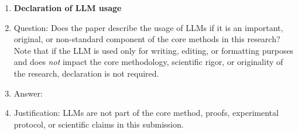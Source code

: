 \begin{enumerate}
\item {\bf Declaration of LLM usage}
    \item[] Question: Does the paper describe the usage of LLMs if it is an important, original, or non-standard component of the core methods in this research? Note that if the LLM is used only for writing, editing, or formatting purposes and does \emph{not} impact the core methodology, scientific rigor, or originality of the research, declaration is not required.
    \item[] Answer: \answerNA{}
    \item[] Justification: LLMs are not part of the core method, proofs, experimental protocol, or scientific claims in this submission.

\end{enumerate}
